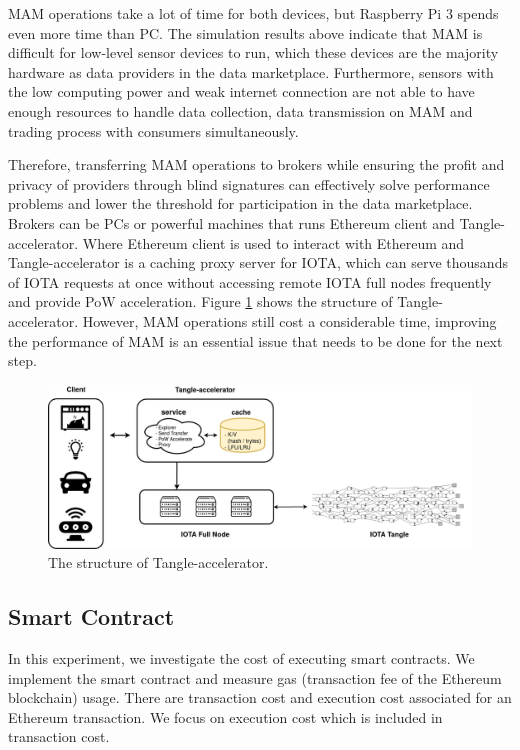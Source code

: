 \documentclass[journal,article,applsci,submit,moreauthors,pdftex]{Definitions/mdpi}
\begin{document}
MAM operations take a lot of time for both devices, but Raspberry Pi 3 spends even more time than PC. The simulation results above indicate that MAM is difficult for low-level sensor devices to run, which these devices are the majority hardware as data providers in the data marketplace. Furthermore, sensors with the low computing power and weak internet connection are not able to have enough resources to handle data collection, data transmission on MAM and trading process with consumers simultaneously. 

Therefore, transferring MAM operations to brokers while ensuring the profit and privacy of providers through blind signatures can effectively solve performance problems and lower the threshold for participation in the data marketplace. Brokers can be PCs or powerful machines that runs Ethereum client and Tangle-accelerator\cite{TA}. Where Ethereum client is used to interact with Ethereum and Tangle-accelerator is a caching proxy server for IOTA, which can serve thousands of IOTA requests at once without accessing remote IOTA full nodes frequently and provide PoW acceleration. Figure \ref{fig:ta_struct} shows the structure of Tangle-accelerator. However, MAM operations still cost a considerable time, improving the performance of MAM is an essential issue that needs to be done for the next step.  

\begin{figure}[H]
    \centering
    \includegraphics[width=5.5 in]{ta_structure}
    \caption{The structure of Tangle-accelerator.}
    \label{fig:ta_struct}
\end{figure}

\subsection{Smart Contract}

In this experiment, we investigate the cost of executing smart contracts. We implement the smart contract and measure gas (transaction fee of the Ethereum blockchain) usage. There are transaction cost and execution cost associated for an Ethereum transaction. We focus on execution cost which is included in transaction cost.
\end{document}
